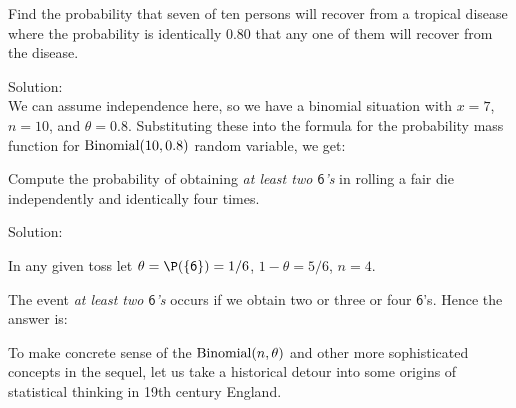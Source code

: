 \begin{example}\label{Eg:70f10recover}
Find the probability that seven of ten persons will recover from a
  tropical disease where the probability is
  identically $0.80$ that any one of them will recover from the
  disease.

{Solution:}\\[4pt]
We can assume independence here, so we have a binomial
situation with  $x=7$, $n=10$, and $\theta=0.8$. Substituting these into the formula for the probability mass function for $\mbox{{\rm Binomial}}(10,0.8)$ random variable, we get:
\end{example}

\begin{example}\label{Eg:alteast2_6s}
{Compute the probability of obtaining {\em at least two
    $\mathsf{6}$'s} in rolling a fair die independently and identically
  four times.}

{Solution:}\\[4pt]
{In any given toss let $\theta=\P(\{\mathsf{6}\})=1/6$,
$1-\theta=5/6$, $n=4$.

The event {\em at least two $\mathsf{6}$'s} occurs if we obtain two or
three or four $\mathsf{6}$'s.  Hence the answer is:
}
\end{example}

To make concrete sense of the $\mbox{{\rm Binomial}}(n,\theta)$ and other more sophisticated concepts in the sequel, let us take a historical detour into some origins of statistical thinking in 19th century England.

